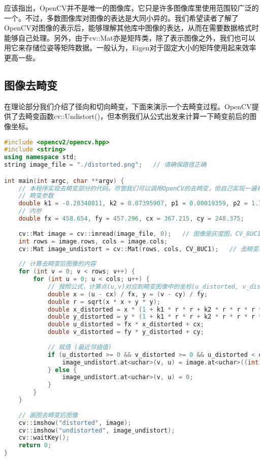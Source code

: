 应该指出，OpenCV并不是唯一的图像库，它只是许多图像库里使用范围较广泛的一个。不过，多数图像库对图像的表达是大同小异的。我们希望读者了解了OpenCV对图像的表示后，能够理解其他库中图像的表达，从而在需要数据格式时能够自己处理。另外，由于cv::Mat亦是矩阵类，除了表示图像之外，我们也可以用它来存储位姿等矩阵数据。一般认为，Eigen对于固定大小的矩阵使用起来效率更高一些。

\subsection{图像去畸变}
在理论部分我们介绍了径向和切向畸变，下面来演示一个去畸变过程。OpenCV提供了去畸变函数cv::Undistort()，但本例我们从公式出发来计算一下畸变前后的图像坐标。
\begin{lstlisting}[language=C++,caption=slambook/ch5/imageBasics/undistortImage.cpp]
#include <opencv2/opencv.hpp>
#include <string>
using namespace std;
string image_file = "./distorted.png";   // 请确保路径正确

int main(int argc, char **argv) {
	// 本程序实现去畸变部分的代码。尽管我们可以调用OpenCV的去畸变，但自己实现一遍有助于理解。
	// 畸变参数
	double k1 = -0.28340811, k2 = 0.07395907, p1 = 0.00019359, p2 = 1.76187114e-05;
	// 内参
	double fx = 458.654, fy = 457.296, cx = 367.215, cy = 248.375;
	
	cv::Mat image = cv::imread(image_file, 0);   // 图像是灰度图，CV_8UC1
	int rows = image.rows, cols = image.cols;
	cv::Mat image_undistort = cv::Mat(rows, cols, CV_8UC1);   // 去畸变以后的图
	
	// 计算去畸变后图像的内容
	for (int v = 0; v < rows; v++) {
		for (int u = 0; u < cols; u++) {
			// 按照公式，计算点(u,v)对应到畸变图像中的坐标(u_distorted, v_distorted)
			double x = (u - cx) / fx, y = (v - cy) / fy;
			double r = sqrt(x * x + y * y);
			double x_distorted = x * (1 + k1 * r * r + k2 * r * r * r * r) + 2 * p1 * x * y + p2 * (r * r + 2 * x * x);
			double y_distorted = y * (1 + k1 * r * r + k2 * r * r * r * r) + p1 * (r * r + 2 * y * y) + 2 * p2 * x * y;
			double u_distorted = fx * x_distorted + cx;
			double v_distorted = fy * y_distorted + cy;
			
			// 赋值 (最近邻插值)
			if (u_distorted >= 0 && v_distorted >= 0 && u_distorted < cols && v_distorted < rows) {
				image_undistort.at<uchar>(v, u) = image.at<uchar>((int) v_distorted, (int) u_distorted);
			} else {
				image_undistort.at<uchar>(v, u) = 0;
			}
		}
	}
	
	// 画图去畸变后图像
	cv::imshow("distorted", image);
	cv::imshow("undistorted", image_undistort);
	cv::waitKey();
	return 0;
}
\end{lstlisting}

